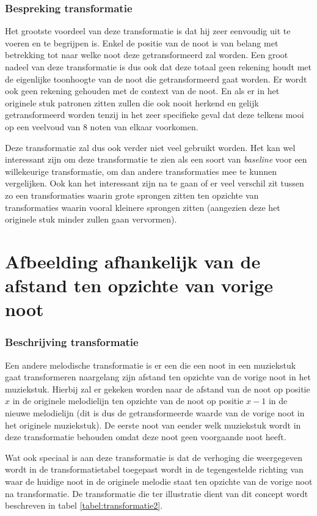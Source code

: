 \subsubsection{Bespreking transformatie}
Het grootste voordeel van deze transformatie is dat hij zeer eenvoudig uit te voeren en te begrijpen is. Enkel de positie van de noot is van belang met betrekking tot naar welke noot deze getransformeerd zal worden. Een groot nadeel van deze transformatie is dus ook dat deze totaal geen rekening houdt met de eigenlijke toonhoogte van de noot die getransformeerd gaat worden. Er wordt ook geen rekening gehouden met de context van de noot. En als er in het originele stuk patronen zitten zullen die ook nooit herkend en gelijk getransformeerd worden tenzij in het zeer specifieke geval dat deze telkens mooi op een veelvoud van 8 noten van elkaar voorkomen. 

Deze transformatie zal dus ook verder niet veel gebruikt worden. Het kan wel interessant zijn om deze transformatie te zien als een soort van \textit{baseline} voor een willekeurige transformatie, om dan andere transformaties mee te kunnen vergelijken. Ook kan het interessant zijn na te gaan of er veel verschil zit tussen zo een transformaties waarin grote sprongen zitten ten opzichte van transformaties waarin vooral kleinere sprongen zitten (aangezien deze het originele stuk minder zullen gaan vervormen).

\section{Afbeelding afhankelijk van de afstand ten opzichte van vorige noot}
\label{MT:afstand_vorige}
\subsubsection{Beschrijving transformatie}
Een andere melodische transformatie is er een die een noot in een muziekstuk gaat transformeren naargelang zijn afstand ten opzichte van de vorige noot in het muziekstuk. Hierbij zal er gekeken worden naar de afstand van de noot op positie $x$ in de originele melodielijn ten opzichte van de noot op positie $x-1$ in de nieuwe melodielijn (dit is dus de getransformeerde waarde van de vorige noot in het originele muziekstuk). De eerste noot van eender welk muziekstuk wordt in deze transformatie behouden omdat deze noot geen voorgaande noot heeft. 

Wat ook speciaal is aan deze transformatie is dat de verhoging die weergegeven wordt in de transformatietabel toegepast wordt in de tegengestelde richting van waar de huidige noot in de originele melodie staat ten opzichte van de vorige noot na transformatie. De transformatie die ter illustratie dient van dit concept wordt beschreven in tabel \ref{tabel:transformatie2}. 

